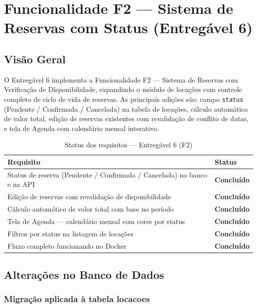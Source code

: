 \documentclass[12pt, a4paper]{article}
\newcommand{\thead}[1]{\cellcolor{tableheader}\color{white}\bfseries #1}
\newcommand{\talt}{\rowcolor{tablerowalt}}
\newcommand{\tok}{\textcolor{successgreen}{\textbf{Concluído}}}
\begin{document}
\section{Funcionalidade F2 — Sistema de Reservas com Status (Entregável 6)}

\subsection{Visão Geral}

O Entregável 6 implementa a Funcionalidade F2 — Sistema de Reservas com Verificação de Disponibilidade, expandindo o módulo de locações com controle completo de ciclo de vida de reservas. As principais adições são: campo \texttt{status} (Pendente / Confirmada / Cancelada) na tabela de locações, cálculo automático de valor total, edição de reservas existentes com revalidação de conflito de datas, e tela de Agenda com calendário mensal interativo.

\begin{table}[H]
\centering
\begin{tabularx}{\textwidth}{|X|l|}
\hline
\thead{Requisito} & \thead{Status} \\
\hline
Status de reserva (Pendente / Confirmada / Cancelada) no banco e na API & \tok \\
\talt Edição de reservas com revalidação de disponibilidade & \tok \\
Cálculo automático de valor total com base no período & \tok \\
\talt Tela de Agenda — calendário mensal com cores por status & \tok \\
Filtros por status na listagem de locações & \tok \\
\talt Fluxo completo funcionando no Docker & \tok \\
\hline
\end{tabularx}
\caption{Status dos requisitos — Entregável 6 (F2)}
\end{table}

\subsection{Alterações no Banco de Dados}

\subsubsection{Migração aplicada à tabela locacoes}
\end{document}
